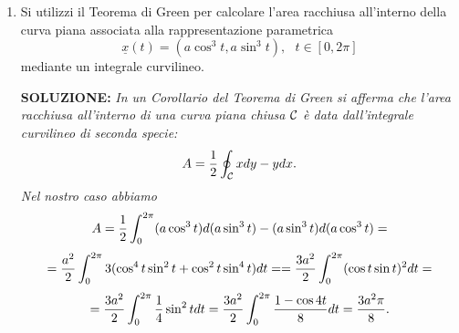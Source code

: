 \documentclass[12pt,a4paper]{report}\pagenumbering{roman}
\begin{document}
\begin{enumerate}
{\bf SOLUZIONE:} {\sl Il campo $\underline{f}=(f_1,f_2,f_3)$ 
soddisfa le equazioni di compatibilit\`a
$${\partial f_1\over\partial y}=0={\partial f_2\over\partial x},\ \ \ \
{\partial f_1\over\partial z}=-{1\over z^2}={\partial f_3\over\partial x},
\ \ \ \ {\partial f_2\over\partial z}={3\over z^2}={\partial f_3\over\partial y}
$$
quindi $\underline{f}$ \`e un campo conservativo in una regione 
semplicemente connessa di ${\bf R}^3$ non contenente il piano $z=0$. 
Ora calcoliamo il potenziale di $\underline{f}$:
$$U=-\int f_1 dx+g(y,z)=-{x\over z}+g(y,z).$$
Adesso, da
$$f_2=-{\partial U\over\partial y}={\partial g\over\partial y}=-{3\over z}$$
si ottiene
$$g(y,z)=-{3y\over z}+h(z)\ \ \ \ \mbox{e}\ \ \ \ U(x,y,z)=-{x\over z}
+{3y\over z}+h(z).$$
Inoltre, da
$$f_3=-{\partial U\over\partial z}={3y-x\over z^2}+
{\partial h\over\partial z}={3y-x+z^3\over z^2} $$
si ottiene $h(z)={z^2\over2}$. Quindi 
$$U=-{x-3y\over z}-{z^2\over2}+C$$
e il campo \`e conservativo su tutto il suo dominio. Alla luce
di questa deduzione, per calcolare il lavoro \`e sufficiente calcolare
$$L=U(x(2),y(2),z(2))-U(x(4),y(4),z(4))=U(2,4,1)-U(4,16,3)=$$
$$=-{(-10)}-{1\over 2}+{-44\over3}+{9\over2}=-{2\over3}.$$}

\item Si utilizzi il Teorema di Green per calcolare l'area racchiusa all'interno
della curva piana associata alla rappresentazione parametrica
$$\underline{x}(t)=(a\cos^3 t ,a\sin^3 t),\ \ \  t\in[0,2\pi]$$
mediante un integrale curvilineo.
\bigskip 

{\bf SOLUZIONE:} {\sl In un Corollario del Teorema di Green si afferma che
l'area racchiusa all'interno di una curva piana chiusa ${\cal C}$ \`e data 
dall'integrale curvilineo di seconda specie:
$$A={1\over2}\oint_{\cal C}xdy-ydx.$$
Nel nostro caso abbiamo
$$A={1\over2}\int_{0}^{2\pi}(a\cos^3 t)d(a\sin^3 t)-(a\sin^3 t)d(a\cos^3 t)=$$
$$={a^2\over2}\int_{0}^{2\pi}3(\cos^4t\sin^2t+ \cos^2t\sin^4t)dt=
={3a^2\over2}\int_{0}^{2\pi}(\cos t\sin t)^2dt=$$
$$={3a^2\over2}\int_{0}^{2\pi}{1\over4}\sin^2tdt=
{3a^2\over2}\int_{0}^{2\pi}{1-\cos 4t\over8}dt={3a^2\pi\over8}.$$
}

\end{enumerate}
\end{document}
